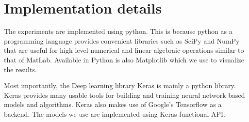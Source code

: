 \section{Implementation details}

The experiments are implemented using python. This is because python as a programming language provides convenient libraries such as SciPy\cite{bressert2012scipy} and NumPy\cite{van2011numpy,bressert2012scipy} that are useful for high level numerical and linear algebraic operations similar to that of MatLab. Available in Python is also Matplotlib which we use to visualize the results.

Most importantly, the Deep learning library Keras is mainly a python library\cite{chollet2018deep}. Keras provides many usable tools for building and training neural network based models and algorithms. Keras also makes use of Google's Tensorflow as a backend\cite{gulli2017deep,abadi2016tensorflow}. The models we use are implemented using Keras functional API.